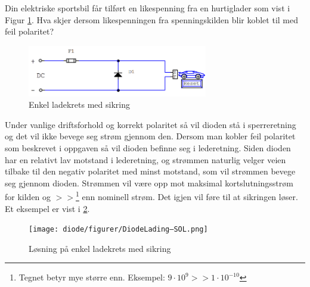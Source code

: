 \begin{question}[name=Oppgave, topic=dioder]
Din elektriske sportsbil får tilført en likespenning fra en hurtiglader som vist i Figur \ref{fig:diodeLading}. Hva skjer dersom likespenningen fra spenningskilden blir koblet til med feil polaritet?

	\begin{figure}[H]
		\centering
		\includegraphics[width=0.7\textwidth]{diode/figurer/DiodeLading.png}
		\caption{Enkel ladekrets med sikring}
		\label{fig:diodeLading}
	\end{figure}

\end{question}

\vspace{0.5cm} %

\begin{solution}[name=Løsningsforslag oppgave]

Under vanlige driftsforhold og korrekt polaritet så vil dioden stå i sperreretning og det vil ikke bevege seg strøm gjennom den. Dersom man kobler feil polaritet som beskrevet i oppgaven så vil dioden befinne seg i lederetning. Siden dioden har en relativt lav motstand i lederetning, og strømmen naturlig velger veien tilbake til den negativ polaritet med minst motstand, som vil strømmen bevege seg gjennom dioden. Strømmen vil være opp mot maksimal kortslutningsstrøm for kilden og $>>$\footnote{Tegnet betyr mye større enn. Eksempel: $9\cdot10^{9}>>1\cdot10^{-10}$} enn nominell strøm. Det igjen vil føre til at sikringen løser. Et eksempel er vist i \ref{fig:diodeLadingSol}.
	\begin{figure}[H]
	\centering
	\texttt{[image: diode/figurer/DiodeLading–SOL.png]}
	\caption{Løsning på enkel ladekrets med sikring}
	\label{fig:diodeLadingSol}
\end{figure}


\end{solution}




